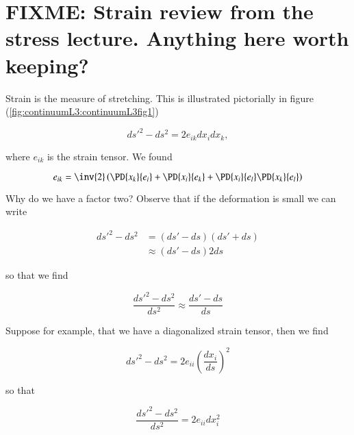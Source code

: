 \label{chap:continuumL3}

\section{FIXME: Strain review from the stress lecture.  Anything here worth keeping?}

Strain is the measure of stretching.  This is illustrated pictorially in figure (\ref{fig:continuumL3:continuumL3fig1})

\begin{equation}\label{eqn:continuumL3:10}
{ds'}^2 - ds^2 = 2 e_{ik} dx_i dx_k,
\end{equation}

where $e_{ik}$ is the strain tensor.  We found

\begin{equation}\label{eqn:continuumL3:30}
e_{ik} = \inv{2} \left( 
\PD{x_k}{e_i} 
+\PD{x_i}{e_k} 
+
\PD{x_i}{e_l} 
\PD{x_k}{e_l} 
\right)
\end{equation}

Why do we have a factor two?  Observe that if the deformation is small we can write

\begin{align*}
{ds'}^2 - ds^2 
&= (ds' - ds)(ds' + ds) \\
&\approx
 (ds' - ds) 2 ds
\end{align*}

so that we find 

\begin{equation}\label{eqn:continuumL3:50}
\frac{{ds'}^2 - ds^2 }{ds^2}
\approx
\frac{ds' - ds }{ds}
\end{equation}

Suppose for example, that we have a diagonalized strain tensor, then we find

\begin{equation}\label{eqn:continuumL3:70}
{ds'}^2 - ds^2 
= 2 e_{ii} \left(\frac{dx_i}{ds}\right)^2
\end{equation}

so that

\begin{equation}\label{eqn:continuumL3:90}
\frac{
{ds'}^2 - ds^2 
}{ds^2}
= 2 e_{ii} dx_i^2
\end{equation}

